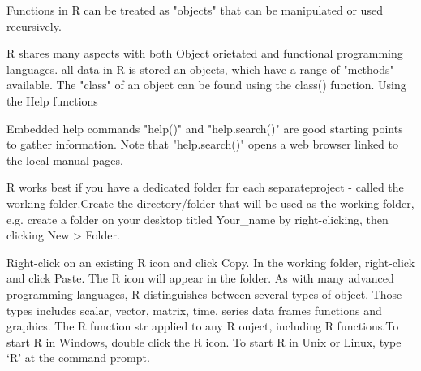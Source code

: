 \begin{frame}

Functions in R can be treated as "objects" that can be manipulated or used recursively.

R shares many aspects with both Object orietated and functional programming languages. all data in R is stored an objects, which have a range of "methods" available. The "class" of an object can be found using the class() function.
Using the Help functions

\end{frame}
\begin{frame}
Embedded help commands "help()" and "help.search()" are good starting points to gather information.
Note that "help.search()" opens a web browser linked to the local manual pages.
 

R works best if you have a dedicated folder for each separateproject - called the working folder.Create the directory/folder that will be used as the working folder, e.g. create a folder on your desktop titled Your_name by right-clicking, then clicking New > Folder. 
 
Right-click on an existing R icon and click Copy.   In the working folder, right-click and click Paste. The R icon will appear in the folder. As with many advanced programming languages, R distinguishes between several types of object. Those types includes scalar, vector, matrix, time, series data frames functions and graphics. The R function str applied to any R onject, including R functions.To start R in Windows, double click the R icon. To start R in Unix or Linux, type ‘R’ at the command prompt. 

\end{frame}
